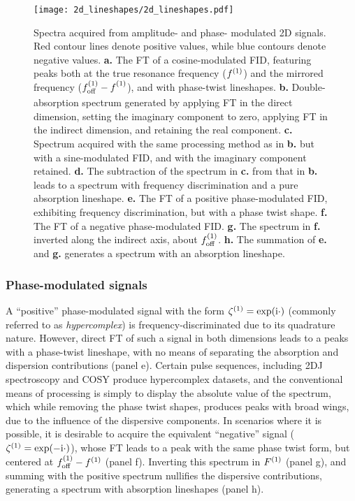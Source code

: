 \begin{figure}
    \centering
    \texttt{[image: 2d\_lineshapes/2d\_lineshapes.pdf]}
    \caption[
        Spectra acquired from amplitude- and phase-modulated \acs{2D} signals.
    ]{
        Spectra acquired from amplitude- and phase- modulated \acs{2D} signals.
        Red contour lines denote positive values, while blue contours denote
        negative values.
        \textbf{a.} The \ac{FT} of a cosine-modulated \ac{FID}, featuring peaks
        both at the true resonance frequency ($f^{(1)}$) and the mirrored
        frequency ($f_{\mathrm{off}}^{(1)} - f^{(1)}_{\vphantom{off}}$), and with phase-twist lineshapes.
        \textbf{b.} Double-absorption spectrum generated by applying \ac{FT}
        in the direct dimension, setting the imaginary component to zero,
        applying \ac{FT} in the indirect dimension, and retaining the real
        component.
        \textbf{c.} Spectrum acquired with the same processing method as in
        \textbf{b.} but with a sine-modulated \ac{FID}, and with the imaginary
        component retained.
        \textbf{d.} The subtraction of the spectrum in \textbf{c.} from that in
        \textbf{b.} leads to a spectrum with frequency discrimination and a
        pure absorption lineshape.
        \textbf{e.} The \ac{FT} of a positive phase-modulated \ac{FID},
        exhibiting frequency discrimination, but with a phase twist shape.
        \textbf{f.} The \ac{FT} of a negative phase-modulated \ac{FID}.
        \textbf{g.} The spectrum in \textbf{f.} inverted along the indirect
        axis, about $f_{\mathrm{off}}^{(1)}$.
        \textbf{h.} The summation of \textbf{e.} and \textbf{g.} generates a
        spectrum with an absorption lineshape.
    }
    \label{fig:2d-lineshapes}
\end{figure}

\subsubsection{Phase-modulated signals}

A ``positive'' phase-modulated signal with the form $\zeta^{(1)} = \exp(\mathrm{i} \cdot)$
(commonly referred to as \emph{hypercomplex}) is frequency-discriminated due to
its quadrature nature. However, direct \ac{FT} of such a signal in both
dimensions leads to a peaks with a phase-twist lineshape, with no means of
separating the absorption and dispersion contributions (panel e). Certain pulse
sequences, including \ac{2DJ} spectroscopy\cite{Aue1976,Morris2009} and
\ac{COSY}\cite{Jeener1971,Jeener2016,Aue1976a} produce hypercomplex datasets,
and the conventional means of processing is simply to display the absolute
value of the spectrum, which while removing the phase twist shapes, produces
peaks with broad wings, due to the influence of the dispersive components. In
scenarios where it is possible, it is desirable to acquire the equivalent
``negative'' signal ($\zeta^{(1)} = \exp(-\mathrm{i} \cdot)$), whose \ac{FT} leads to
a peak with the same phase twist form, but centered at $f_{\mathrm{off}}^{(1)} - f^{(1)}$
(panel f). Inverting this spectrum in $F^{(1)}$ (panel g), and summing with the
positive spectrum nullifies the dispersive contributions, generating a spectrum
with absorption lineshapes\cite{Davis1992} (panel h).


